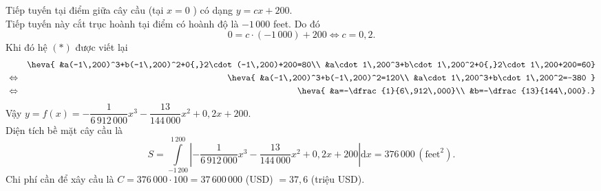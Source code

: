 \begin{ex}
{Tiếp tuyến tại điểm giữa cây cầu (tại $x=0$ ) có dạng
$y=cx+200$.\\
Tiếp tuyến này cắt trục hoành tại điểm có hoành độ là $-1\,000$ feet. Do đó
\[0=c\cdot (-1\,000)+200\Leftrightarrow c=0{,}2.\]
Khi đó hệ $(*)$ được viết lại
\begin{eqnarray*}
& &\heva{
&a(-1\,200)^3+b(-1\,200)^2+0{,}2\cdot(-1\,200)+200=80\\
&a\cdot 1\,200^3+b\cdot 1\,200^2+0{,}2\cdot1\,200+200=60}\\
&\Leftrightarrow &
\heva{
&a(-1\,200)^3+b(-1\,200)^2=120\\
&a\cdot 1\,200^3+b\cdot 1\,200^2=-380
}\\
&\Leftrightarrow &\heva{
&a=-\dfrac{1}{6\,912\,000}\\
&b=-\dfrac{13}{144\,000}.}
\end{eqnarray*}
Vậy $y=f(x)=-\dfrac{1}{6\,912\,000}{x^3}-\dfrac{13}{144\,000}{x^2}+0{,}2x+200$.\\
Diện tích bề mặt cây cầu là \[S=\displaystyle\int\limits_{-1\,200}^{1\,200}\left|-\dfrac{1}{6\,912\,000} x^3-\dfrac{13}{144\,000} x^2+0{,}2 x+200\right| \mathrm{d} x=376\,000\,\left(\text{feet}^2\right).\]
Chi phí cần để xây cầu là $C=376\,000\cdot100=37\,600\,000$ (USD) $=37{,}6$ (triệu USD).
}
\end{ex}

